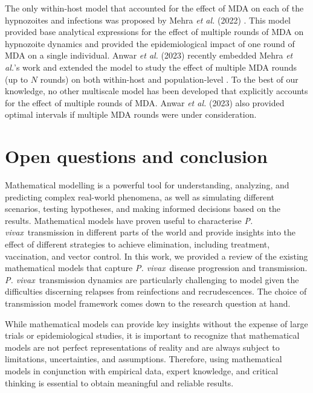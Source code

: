 \documentclass[12pt]{article}
\newcommand{\pv}{\textit{P. vivax}}
\newcommand{\etal}{\textit{et al. }}
\begin{document}
 The only within-host model that accounted for the effect of MDA on each of the hypnozoites and infections was proposed by Mehra \etal(2022) \cite{mehra2022hypnozoite}. This model provided base analytical expressions for the effect of multiple rounds of MDA on hypnozoite dynamics and provided the epidemiological impact of one round of MDA on a single individual. Anwar \etal(2023) recently embedded Mehra \textit{et al.}'s work \cite{mehra2022hypnozoite} and extended the model to study the effect of multiple MDA rounds (up to $N$ rounds) on both within-host and population-level \cite{anwar2023optimal}. To the best of our knowledge, no other multiscale model has been developed that explicitly accounts for the effect of multiple rounds of MDA. Anwar \etal(2023) \cite{anwar2023optimal}
 also provided optimal intervals if multiple MDA rounds were under consideration. 



\section{Open questions and conclusion}\label{conclusion}
  
Mathematical modelling is a powerful tool for understanding, analyzing, and predicting complex real-world phenomena, as well as simulating different scenarios, testing hypotheses, and making informed decisions based on the results. Mathematical models have proven useful to characterise \pv~transmission in different parts of the world and provide insights into the effect of different strategies to achieve elimination, including treatment, vaccination, and vector control. In this work, we provided a review of the existing mathematical models that capture \pv~disease progression and transmission. \pv~transmission dynamics are particularly challenging to model given the difficulties discerning relapses from reinfections and recrudescences. The choice of transmission model framework comes down to the research question at hand.

While mathematical models can provide key insights without the expense of large trials or epidemiological studies, it is important to recognize that mathematical models are not perfect representations of reality and are always subject to limitations, uncertainties, and assumptions. Therefore, using mathematical models in conjunction with empirical data, expert knowledge, and critical thinking is essential to obtain meaningful and reliable results. 
\end{document}
